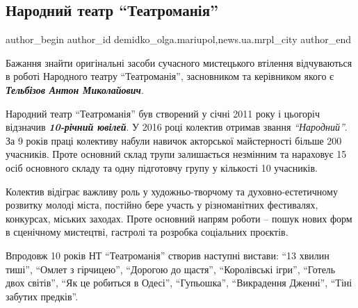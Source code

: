  
 
 
 
 
 
\subsection{Народний театр \enquote{Театроманія}}
\label{sec:26_03_2021.stz.news.ua.mrpl_city.1.narodnyj_teatr_teatromania}
 
\ifcmt
 author_begin
   author_id demidko_olga.mariupol,news.ua.mrpl_city
 author_end
\fi

Бажання знайти оригінальні засоби сучасного мистецького втілення відчуваються в
роботі Народного театру \enquote{Театроманія}, засновником та керівником якого є
\emph{\textbf{Тельбізов Антон Миколайович}}.

Народний театр \enquote{Театроманія} був створений у січні 2011 року і цьогоріч
відзначив \emph{\textbf{10-річний ювілей}}. У 2016 році колектив отримав звання \emph{\enquote{Народний}}. За
9 років праці колективу набули навичок акторської майстерності більше 200
учасників. Проте основний склад трупи залишається незмінним та нараховує 15
осіб основного складу та одну підготовчу групу у кількості 10 учасників.


Колектив відіграє важливу роль у художньо-творчому та духовно-естетичному
розвитку молоді міста, постійно бере участь у різноманітних фестивалях,
конкурсах, міських заходах. Проте основний напрям роботи – пошук нових форм в
сценічному мистецтві, гастролі та розробка соціальних проєктів.

Впродовж 10 років НТ \enquote{Театроманія} створив наступні вистави:  \enquote{13 хвилин тиші},
\enquote{Омлет з гірчицею}, \enquote{Дорогою до щастя}, \enquote{Королівські ігри}, \enquote{Готель двох
світів}, \enquote{Як це робиться в Одесі}, \enquote{Гупьошка}, \enquote{Викрадення Дженні}, \enquote{Тіні
забутих предків}.


